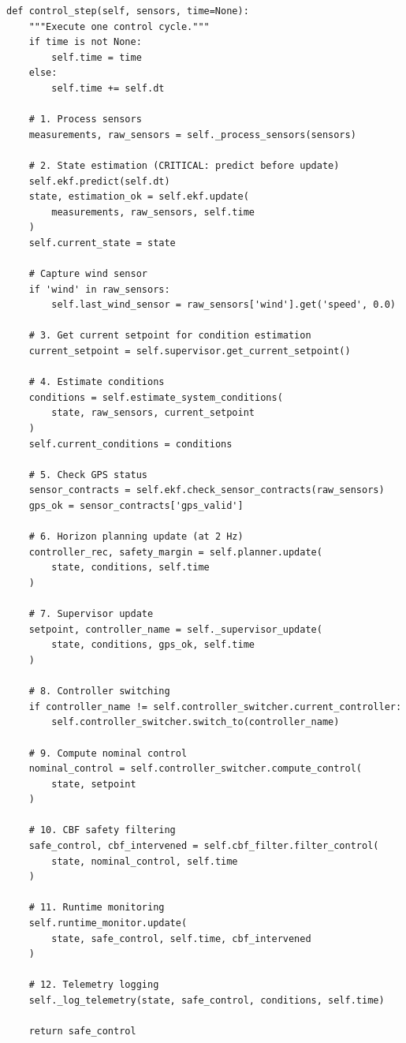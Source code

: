 \begin{lstlisting}[caption={Complete control step method}]
def control_step(self, sensors, time=None):
    """Execute one control cycle."""
    if time is not None:
        self.time = time
    else:
        self.time += self.dt

    # 1. Process sensors
    measurements, raw_sensors = self._process_sensors(sensors)

    # 2. State estimation (CRITICAL: predict before update)
    self.ekf.predict(self.dt)
    state, estimation_ok = self.ekf.update(
        measurements, raw_sensors, self.time
    )
    self.current_state = state

    # Capture wind sensor
    if 'wind' in raw_sensors:
        self.last_wind_sensor = raw_sensors['wind'].get('speed', 0.0)

    # 3. Get current setpoint for condition estimation
    current_setpoint = self.supervisor.get_current_setpoint()

    # 4. Estimate conditions
    conditions = self.estimate_system_conditions(
        state, raw_sensors, current_setpoint
    )
    self.current_conditions = conditions

    # 5. Check GPS status
    sensor_contracts = self.ekf.check_sensor_contracts(raw_sensors)
    gps_ok = sensor_contracts['gps_valid']

    # 6. Horizon planning update (at 2 Hz)
    controller_rec, safety_margin = self.planner.update(
        state, conditions, self.time
    )

    # 7. Supervisor update
    setpoint, controller_name = self._supervisor_update(
        state, conditions, gps_ok, self.time
    )

    # 8. Controller switching
    if controller_name != self.controller_switcher.current_controller:
        self.controller_switcher.switch_to(controller_name)

    # 9. Compute nominal control
    nominal_control = self.controller_switcher.compute_control(
        state, setpoint
    )

    # 10. CBF safety filtering
    safe_control, cbf_intervened = self.cbf_filter.filter_control(
        state, nominal_control, self.time
    )

    # 11. Runtime monitoring
    self.runtime_monitor.update(
        state, safe_control, self.time, cbf_intervened
    )

    # 12. Telemetry logging
    self._log_telemetry(state, safe_control, conditions, self.time)

    return safe_control
\end{lstlisting}

